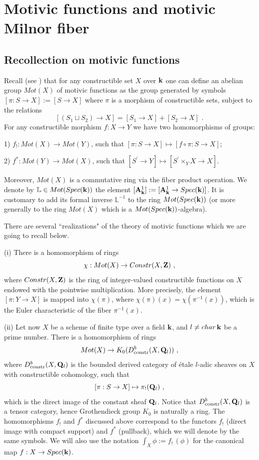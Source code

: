 \documentclass[12pt]{article}
\begin{document}
\section{Motivic functions and motivic Milnor fiber}

\subsection{Recollection on motivic functions}

Recall (see \cite{DeLo1}) that for any constructible set $X$ over ${\bf k}$ one can define an abelian group $Mot(X)$ of motivic functions as the group generated by symbols $[\pi:S\to X]:=[S\to X]$ where $\pi$ is a morphism of constructible sets, subject to the relations $$[(S_1\sqcup S_2)\to X]=[S_1\to X]+[S_2\to X]\,\,.$$
For any constructible morphism $f:X\to Y$ we have two homomorphisms of groups: 

1) $f_{!}: Mot(X)\to Mot(Y)$, such that
$[\pi:S\to X]\mapsto [f\circ \pi:S\to X]$;

2) $f^{\ast}: Mot(Y)\to Mot(X)$, such that
$[S^{\prime}\to Y]\mapsto [S^{\prime}\times_YX\to X]$.



Moreover, $Mot(X)$ is a commutative ring via the fiber product operation.
We denote by ${\mathbb L}\in Mot(Spec({\bf k}))$ the element $[{\bf A}^1_{{\bf k}}]:=
[{\bf A}^1_{\bf k} \to  Spec({\bf k})]$. It is customary to add its formal inverse
${\mathbb L}^{-1}$ to the ring $Mot(Spec({\bf k}))$ (or more generally to the ring $Mot(X)$ which is a $Mot(Spec({\bf k}))$-algebra).


There are several ``realizations" of the theory of motivic functions which we are going to recall below.

(i) There is a homomorphism of rings 
$$\chi: Mot(X)\to Constr(X,{\bf Z})\,\,,$$ where
$ Constr(X,{\bf Z})$ is the ring of integer-valued constructible functions on $X$ endowed with the pointwise multiplication. More precisely, the element $[\pi:Y\to X]$ is mapped into $\chi(\pi)$, where
$\chi(\pi)(x)=\chi(\pi^{-1}(x))$, which is the Euler characteristic of the fiber $\pi^{-1}(x)$.

(ii) Let now $X$ be a scheme of finite type over a field ${\bf k}$, and $l\ne char\,{\bf k}$ be a prime number. There is a homomorphism of rings
$$Mot(X)\to K_0(D^b_{\operatorname{constr}}(X,{\bf Q}_l))\,\,,$$
 where $D^b_{\operatorname{constr}}(X,{\bf Q}_l)$ is the bounded derived category of \'etale $l$-adic  sheaves on  $X$ with constructible cohomology, such that
$$[\pi:S\to X]\mapsto \pi_{!}({\bf Q}_l)\,\,,$$
which is the direct image of the constant sheaf ${\bf Q}_l$. Notice that $D^b_{\operatorname{constr}}(X,{\bf Q}_l)$ is a tensor category, hence Grothendieck group $K_0$ is naturally a ring. The homomorphisms $f_{!}$ and $f^{\ast}$ discussed above correspond to the functors $f_{!}$ (direct image with compact support) and $f^{\ast}$ (pullback), which we will denote by the same symbols. We will also use the notation
$\int_X\phi:=f_{!}\,(\phi)$ for the canonical map $f:X\to Spec({\bf k})$.
\end{document}
